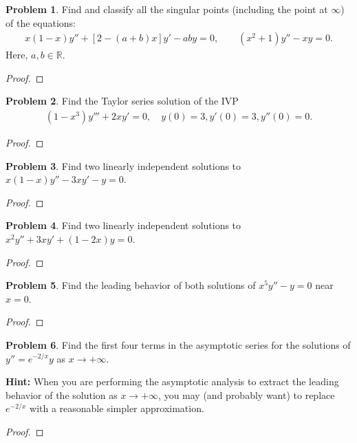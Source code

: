 \documentclass[12pt]{article}
\theoremstyle{definition}
\newtheorem{problem}{Problem}
\begin{document}
\begin{problem}
  Find and classify all the singular points (including the point at $\infty$) of the equations:
  \begin{align*}
    x(1-x)y'' + [2-(a+b)x]y' - aby = 0, \qquad (x^2 + 1)y'' - xy = 0.
  \end{align*}
  Here, $a, b \in \mathbb{R}$.
\end{problem}

\begin{proof}
\end{proof}
\newpage


\begin{problem}
  Find the Taylor series solution of the IVP
  \begin{align*}
    (1-x^3)y''' + 2xy' = 0,\quad y(0) = 3, y'(0) = 3, y''(0) = 0.
  \end{align*}
\end{problem}

\begin{proof}
\end{proof}
\newpage


\begin{problem}
  Find two linearly independent solutions to $x(1-x)y'' - 3xy'-y = 0$.
\end{problem}

\begin{proof}
\end{proof}
\newpage


\begin{problem}
  Find two linearly independent solutions to $x^2y'' + 3xy' + (1-2x)y = 0$.
\end{problem}

\begin{proof}
\end{proof}
\newpage


\begin{problem}
  Find the leading behavior of both solutions of $x^5y'' - y = 0$ near $x=0$.
\end{problem}

\begin{proof}
\end{proof}
\newpage


\begin{problem}
  Find the first four terms in the asymptotic series for the solutions of $y'' = e^{-2/x}y$ as $x\to + \infty$.

  \textbf{Hint:} When you are performing the asymptotic analysis to extract the leading
  behavior of the solution as $x\to  + \infty$, you may (and probably want) to replace
  $e^{-2/x}$ with a reasonable simpler approximation.
\end{problem}

\begin{proof}
\end{proof}
\newpage
\end{document}
